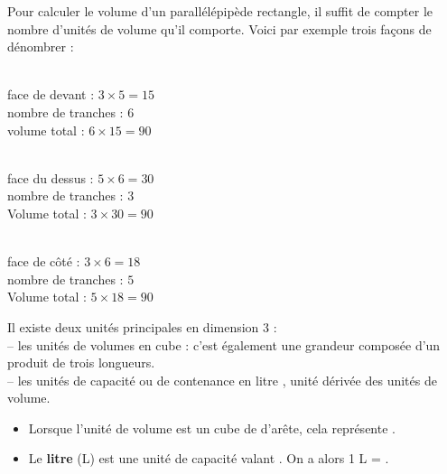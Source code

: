 \begin{exemple*1}
   Pour calculer le volume d'un parallélépipède rectangle, il suffit de \og compter \fg{} le nombre d'unités de volume qu'il comporte. Voici par exemple trois façons de dénombrer :
\vspace*{-0.4cm}
\begin{multicols}{3}
   \begin{center}
      \ \\
      face de devant : $3\times5 =15$ \\
      nombre de tranches : $6$ \\
      volume total : $6\times15 =90$
   \end{center} 
   \begin{center}
      \ \\
      face du dessus : $5\times6 =30$ \\
      nombre de tranches : $3$ \\
      Volume total : $3\times30 =90$
   \end{center}      
   \begin{center}   
       \ \\
      face de côté : $3\times6 =18$ \\
      nombre de tranches : $5$ \\
      Volume total : $5\times18 =90$
   \end{center}
\end{multicols}
\vspace*{-7mm}
\end{exemple*1}

\bigskip

Il existe deux unités principales en dimension 3 : \\
-- les unités de volumes en \og cube \fg{} : c'est également une grandeur composée d'un produit de trois longueurs. \\
-- les unités de capacité ou de contenance en \og litre \fg, unité dérivée des unités de volume. \medskip

\begin{definition}
   \begin{itemize}
      \item Lorsque l'unité de volume est un cube de  d'arête, cela représente {\bf {}}.
      \item Le {\bf litre} (L) est une unité de capacité valant . On a alors 1 L = . \\ [-8mm]
   \end{itemize}
\end{definition}

